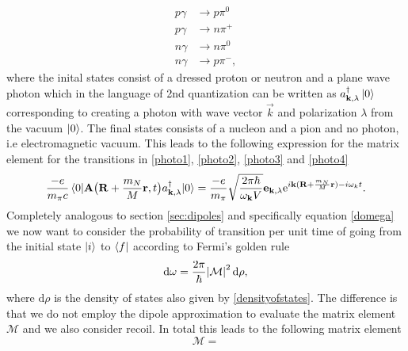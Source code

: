 \begin{align}
    p \gamma & \rightarrow p \pi^0 \label{photo1}\\
    p \gamma & \rightarrow n \pi^+ \label{photo2}\\
    n \gamma & \rightarrow n \pi^0 \label{photo3}\\
    n \gamma & \rightarrow p \pi^- \label{photo4},
\end{align}
where the inital states consist of a dressed proton or neutron and a plane wave photon which in the language of 2nd quantization can be written as $a_{\bm{\mathrm{k}},\lambda}^\dagger \ket{0}$ corresponding to creating a photon with wave vector $\vec{k}$ and polarization $\lambda$ from the vacuum $\ket{0}$. The final states consists of a nucleon and a pion and no photon, i.e electromagnetic vacuum. This leads to the following expression for the matrix element for the transitions in \eqref{photo1}, \eqref{photo2}, \eqref{photo3} and \eqref{photo4}
\begin{equation}
    \frac{-e}{m_\pi c}\mel*{0}{\bm{\mathrm{A}}\big( \bm{\mathrm{R}}+\frac{m_N}{M}\bm{\mathrm{r}},t\big) a_{\bm{\mathrm{k}},\lambda}^\dagger}{0} = \frac{-e}{m_\pi} \sqrt{\frac{2\pi \hbar}{\omega_{\bm{\mathrm{k}}}V}} \bm{\mathrm{e}}_{\bm{\mathrm{k}},\lambda}\text{e}^{i\bm{\mathrm{k}}(\bm{\mathrm{R}}+\frac{m_N}{M}\bm{\mathrm{r}})-i\omega_k t}.
\end{equation}
Completely analogous to section \ref{sec:dipoles} and specifically equation \eqref{domega} we now want to consider the probability of transition per unit time of going from the initial state $\ket{i}$ to $\bra{f}$ according to Fermi's golden rule
\begin{equation}
        \text{d}\omega = \frac{2\pi}{\hbar} \abs{\mathcal{M}}^2 \text{d}\rho,
\end{equation}
where $\text{d}\rho
$ is the density of states also given by \eqref{densityofstates}. The difference is that we do not employ the dipole approximation to evaluate the matrix element $\mathcal{M}$ and we also consider recoil. In total this leads to the following matrix element
\begin{equation}
    \mathcal{M}=
\end{equation}
